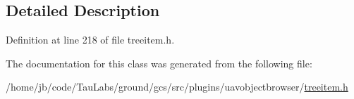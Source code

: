 \subsection{\-Detailed \-Description}


\-Definition at line 218 of file treeitem.\-h.



\-The documentation for this class was generated from the following file\-:\begin{DoxyCompactItemize}
\item 
/home/jb/code/\-Tau\-Labs/ground/gcs/src/plugins/uavobjectbrowser/\hyperlink{treeitem_8h}{treeitem.\-h}\end{DoxyCompactItemize}
